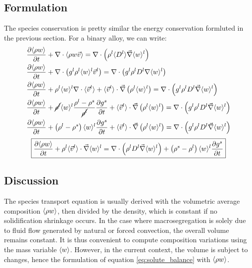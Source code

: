 \subsection{Formulation}
The species conservation is pretty similar the energy conservation formluted in the previous section. For a binary alloy, we can write:
\begin{subequations}
\begin{align}
	& \frac{\partial \langle \rho w \rangle}{\partial t} + \nabla \cdot \langle \rho w \vec{v} \rangle 
	= \nabla  \cdot \left( \rho^l \langle D^l \rangle \vec{\nabla} \langle w \rangle^l  \right) \\
	& \frac{\partial \langle \rho w \rangle}{\partial t} + \nabla \cdot \left( {g^l} \rho^l \langle w \rangle^l \vec{v}^l \right)
	= \nabla  \cdot \left( {g^l}\rho^l D^l \nabla \langle w \rangle^l  \right) \\ 
	& \frac{\partial \langle \rho w \rangle}{\partial t} 
		+ \rho^l \langle w \rangle^l  \nabla \cdot \langle \vec{v}^l \rangle
		+ \langle \vec{v}^l \rangle \cdot \vec{\nabla} \left( \rho^l \langle w \rangle^l \right)
		= \nabla  \cdot \left( {g^l} \rho^l D^l \vec{\nabla} \langle w \rangle^l  \right) \\   
	& \frac{\partial \langle \rho w \rangle}{\partial t} 
		+ \cancel{\rho^l} \langle w \rangle^l  \frac{\rho^l-\rho^s}{\cancel{\rho^l}} \frac{\partial  {g^s} }{\partial t}
		+ \langle \vec{v}^l \rangle \cdot \vec{\nabla} \left( \rho^l \langle w \rangle^l \right)
		= \nabla  \cdot \left( {g^l} \rho^l D^l \vec{\nabla} \langle w \rangle^l  \right) \\ 
	& \frac{\partial \langle \rho w \rangle}{\partial t} 
		+ \left( \rho^l-\rho^s \right) \langle w \rangle^l \frac{\partial  {g^s} }{\partial t}
		+ \langle \vec{v}^l \rangle \cdot \vec{\nabla} \left( \rho^l \langle w \rangle^l \right)
		= \nabla  \cdot \left( {g^l} \rho^l D^l \vec{\nabla} \langle w \rangle^l  \right)        
\end{align}
\end{subequations}
\begin{align}
\label{eq:solute_balance}
 \boxed{ \frac{\partial \langle \rho w \rangle}{\partial t} 
		+ \rho^l \langle \vec{v}^l \rangle \cdot \vec{\nabla} \langle w \rangle^l
		= \nabla  \cdot \left( \rho^l D^l \vec{\nabla} \langle w \rangle^l  \right)
		+ \left( \rho^s-\rho^l \right) \langle w \rangle^l \frac{\partial  {g^s}}{\partial t}}
\end{align}
\subsection{Discussion}
The species transport equation is usually derived with the volumetric average composition $\langle \rho w \rangle$, then
divided by the density, which is constant if no solidification shrinkage occurs. In the case where macrosegregation
is solely due to fluid flow generated by natural or forced convection, the overall
volume remains constant. It is thus convenient to compute composition variations using the mass variable $\langle w \rangle$.
However, in the current context, the volume is subject to changes, hence the formulation of equation 
\eqref{eq:solute_balance} with $\langle \rho w \rangle$.

